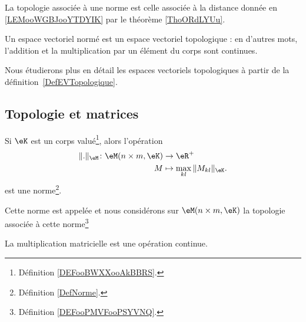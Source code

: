 \begin{definition}      \label{DEFooPMVFooPSYVNQ}
    La topologie associée à une norme est celle associée à la distance donnée en \ref{LEMooWGBJooYTDYIK} par le théorème \ref{ThoORdLYUu}.
\end{definition}

\begin{corollary}       \label{CORooMWCUooKyoyZV}
    Un espace vectoriel normé est un espace vectoriel topologique : en d'autres mots, l'addition et la multiplication par un élément du corps sont continues.
\end{corollary}

Nous étudierons plus en détail les espaces vectoriels topologiques à partir de la définition~\ref{DefEVTopologique}.

\subsection{Topologie et matrices}

\begin{lemmaDef}      \label{DEFooCQHDooYpUAhG}
    Si \( \eK\) est un corps valué\footnote{Définition \ref{DEFooBWXXooAkBBRS}.}, alors l'opération  
    \begin{equation}
        \begin{aligned}
            \| . \|_{\eM}\colon \eM(n\times m,\eK)&\to \eR^+ \\
            M&\mapsto  \max_{kl}\| M_{kl} \|_{\eK}.
        \end{aligned}
    \end{equation}
    est une norme\footnote{Définition \ref{DefNorme}.}.

    Cette norme est appelée  et nous considérons sur \( \eM(n\times m, \eK)\) la topologie associée à cette norme\footnote{Définition \ref{DEFooPMVFooPSYVNQ}.}
\end{lemmaDef}

\begin{proposition}     \label{PROPooOEETooPhqWuf}
    La multiplication matricielle est une opération continue.
\end{proposition}
